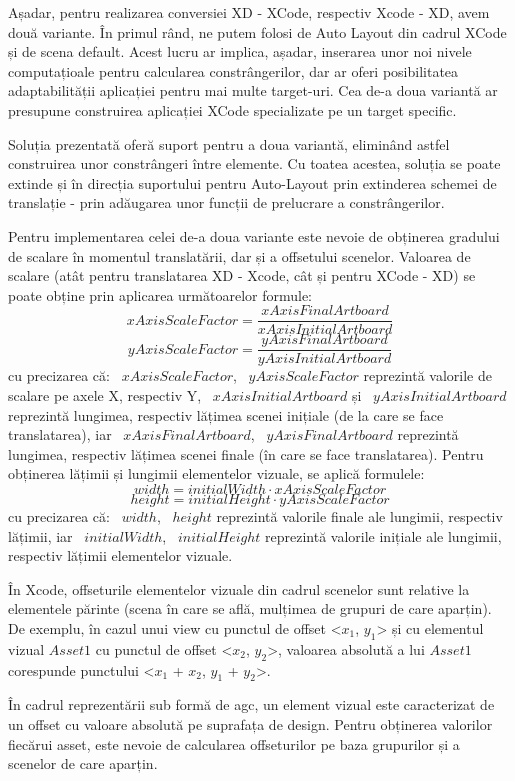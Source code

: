 Așadar, pentru realizarea conversiei XD - XCode, respectiv Xcode - XD, avem două variante.
În primul rând, ne putem folosi de Auto Layout din cadrul XCode și de scena default. Acest lucru ar implica, așadar, inserarea unor noi nivele computațioale pentru calcularea constrângerilor, dar ar oferi posibilitatea adaptabilității aplicației pentru mai multe target-uri.
Cea de-a doua variantă ar presupune construirea aplicației XCode specializate pe un target specific. 

Soluția prezentată oferă suport pentru a doua variantă, eliminând astfel construirea unor constrângeri între elemente. Cu toatea acestea, soluția se poate extinde și în direcția suportului pentru Auto-Layout prin extinderea schemei de translație - prin adăugarea unor funcții de prelucrare a constrângerilor.

Pentru implementarea celei de-a doua variante este nevoie de obținerea gradului de scalare în momentul translatării, dar și a offsetului scenelor. Valoarea de scalare (atât pentru translatarea XD - Xcode, cât și pentru XCode - XD) se poate obține prin aplicarea următoarelor formule: 
\[ xAxisScaleFactor=\frac{xAxisFinalArtboard}{xAxisInitialArtboard} \]
\[ yAxisScaleFactor=\frac{yAxisFinalArtboard}{yAxisInitialArtboard} \]
cu precizarea că:
 ~$xAxisScaleFactor$, ~$yAxisScaleFactor$ reprezintă valorile de scalare pe axele X, respectiv Y,  ~$xAxisInitialArtboard$ și ~$yAxisInitialArtboard$ reprezintă lungimea, respectiv lățimea scenei inițiale (de la care se face translatarea), iar ~$xAxisFinalArtboard$, ~$yAxisFinalArtboard$ reprezintă lungimea, respectiv lățimea scenei finale (în care se face translatarea).
Pentru obținerea lățimii și lungimii elementelor vizuale, se aplică formulele:
\[ width =  {initialWidth}\cdot{xAxisScaleFactor}\]
\[ height =  {initialHeight}\cdot{yAxisScaleFactor}\]
cu precizarea că:
~$width$, ~$height$ reprezintă valorile finale ale lungimii, respectiv lățimii, iar ~$initialWidth$, ~$initialHeight$ reprezintă valorile inițiale ale lungimii, respectiv lățimii elementelor vizuale.

În Xcode, offseturile elementelor vizuale din cadrul scenelor sunt relative la elementele părinte (scena în care se află, mulțimea de grupuri de care aparțin). De exemplu, în cazul unui view cu punctul de offset <$x_1$, $y_1$> și cu elementul vizual $Asset1$ cu punctul de offset <$x_2$, $y_2$>, valoarea absolută a lui $Asset1$ corespunde punctului <$x_1$ + $x_2$, $y_1$ + $y_2$>. 

În cadrul reprezentării sub formă de agc, un element vizual este caracterizat de un offset cu valoare absolută pe suprafața de design. Pentru obținerea valorilor fiecărui asset, este nevoie de calcularea offseturilor pe baza grupurilor și a scenelor de care aparțin.

